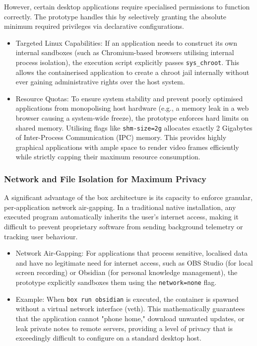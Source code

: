 \documentclass[journal,onecolumn]{IEEEtran}
\newcommand{\code}[1]{\texttt{#1}}
\begin{document}
However, certain desktop applications require specialised permissions to function correctly. The prototype handles this by selectively granting the absolute minimum required privileges via declarative configurations.
\begin{itemize}
    \item Targeted Linux Capabilities: If an application needs to construct its own internal sandboxes (such as Chromium-based browsers utilising internal process isolation), the execution script explicitly passes \code{sys\_chroot}. This allows the containerised application to create a chroot jail internally without ever gaining administrative rights over the host system.
    \item Resource Quotas: To ensure system stability and prevent poorly optimised applications from monopolising host hardware (e.g., a memory leak in a web browser causing a system-wide freeze), the prototype enforces hard limits on shared memory. Utilising flags like \code{shm-size=2g} allocates exactly 2 Gigabytes of Inter-Process Communication (IPC) memory. This provides highly graphical applications with ample space to render video frames efficiently while strictly capping their maximum resource consumption.
\end{itemize}

\subsubsection{Network and File Isolation for Maximum Privacy}
A significant advantage of the box architecture is its capacity to enforce granular, per-application network air-gapping. In a traditional native installation, any executed program automatically inherits the user's internet access, making it difficult to prevent proprietary software from sending background telemetry or tracking user behaviour.
\begin{itemize}
    \item Network Air-Gapping: For applications that process sensitive, localised data and have no legitimate need for internet access, such as OBS Studio (for local screen recording) or Obsidian (for personal knowledge management), the prototype explicitly sandboxes them using the \code{network=none} flag.
    \item Example: When \code{box run obsidian} is executed, the container is spawned without a virtual network interface (veth). This mathematically guarantees that the application cannot "phone home," download unwanted updates, or leak private notes to remote servers, providing a level of privacy that is exceedingly difficult to configure on a standard desktop host.
\end{itemize}
\end{document}
